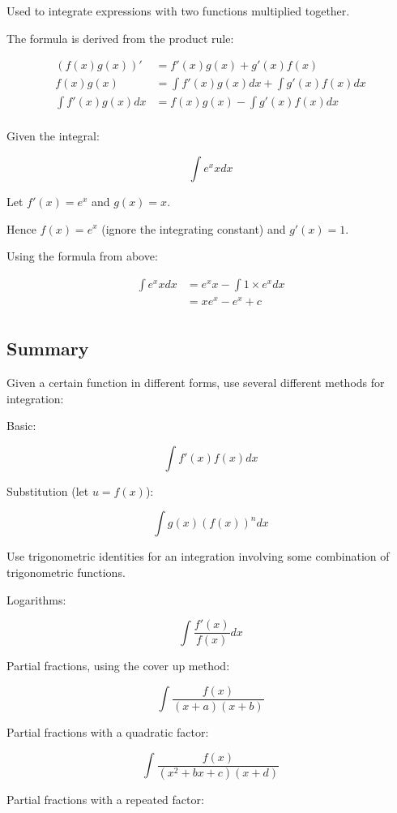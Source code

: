 \documentclass[a4paper,11pt]{report}
\begin{document}
Used to integrate expressions with two functions multiplied together.

The formula is derived from the product rule:

$$
\begin{aligned}
(f(x)g(x))' & = f'(x)g(x) + g'(x)f(x) \\
f(x)g(x) & = \int f'(x)g(x) dx + \int g'(x)f(x) dx \\
\int f'(x)g(x) dx & = f(x)g(x) - \int g'(x)f(x) dx \\
\end{aligned}
$$

Given the integral:

$$
\int e^x x dx
$$

Let $f'(x) = e^x$ and $g(x) = x$.

Hence $f(x) = e^x$ (ignore the integrating constant) and $g'(x) = 1$.

Using the formula from above:

$$
\begin{aligned}
\int e^x x dx & = e^x x - \int 1 \times e^x dx \\
& = x e^x - e^x + c \\
\end{aligned}
$$

\subsection{Summary}

Given a certain function in different forms, use several different methods for
integration:

Basic:

$$
\int f'(x) f(x) dx
$$

Substitution (let $u = f(x)$):

$$
\int g(x) (f(x))^n dx
$$

Use trigonometric identities for an integration involving some combination of
trigonometric functions.

Logarithms:

$$
\int \frac{f'(x)}{f(x)} dx
$$

Partial fractions, using the cover up method:

$$
\int \frac{f(x)}{(x + a)(x + b)}
$$

Partial fractions with a quadratic factor:

$$
\int \frac{f(x)}{(x^2 + bx + c)(x + d)}
$$

Partial fractions with a repeated factor:
\end{document}
